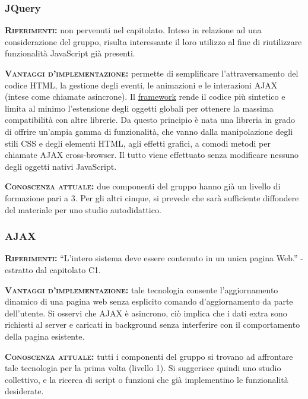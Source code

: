 \subsubsection{JQuery}
\begin{description}
	\item{\scshape\bfseries Riferimenti:} non pervenuti nel capitolato. Inteso in relazione ad una considerazione del gruppo, risulta interessante il loro utilizzo al fine di riutilizzare funzionalità JavaScript già presenti.
	
	\item{\scshape\bfseries Vantaggi d'implementazione:} permette di semplificare l'attraversamento del codice HTML, la gestione degli eventi, le animazioni e le interazioni AJAX (intese come chiamate asincrone). Il \underline{framework} rende il codice più sintetico e limita al minimo l'estensione degli oggetti globali per ottenere la massima compatibilità con altre librerie. Da questo principio è nata una libreria in grado di offrire un'ampia gamma di funzionalità, che vanno dalla manipolazione degli stili CSS e degli elementi HTML, agli effetti grafici, a comodi metodi per chiamate AJAX cross-browser. Il tutto viene effettuato senza modificare nessuno degli oggetti nativi JavaScript.
	
	\item{\scshape\bfseries Conoscenza attuale:} due componenti del gruppo hanno già un livello di formazione pari a 3. Per gli altri cinque, si prevede che sarà sufficiente diffondere del materiale per uno studio autodidattico.
\end{description}

\subsubsection{AJAX}
\begin{description}
	\item{\scshape\bfseries Riferimenti:} ``L'intero sistema deve essere contenuto in un unica pagina Web.'' - estratto dal capitolato C1.

	\item{\scshape\bfseries Vantaggi d'implementazione:} tale tecnologia consente l'aggiornamento dinamico di una pagina web senza esplicito comando d'aggiornamento da parte dell'utente. Si osservi che AJAX è asincrono, ciò implica che i dati extra sono richiesti al server e caricati in background senza interferire con il comportamento della pagina esistente.
	
	\item{\scshape\bfseries Conoscenza attuale:} tutti i componenti del gruppo si trovano ad affrontare tale tecnologia per la prima volta (livello 1). Si suggerisce quindi uno studio collettivo, e la ricerca di script o funzioni che già implementino le funzionalità desiderate.
\end{description}

